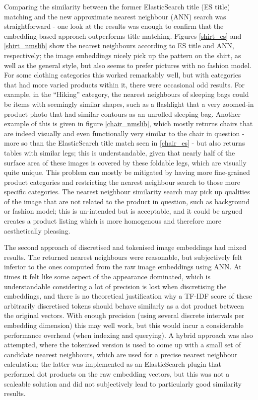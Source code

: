 Comparing the similarity between the former ElasticSearch title (ES title) matching and the new approximate nearest neighbour (ANN) search was straightforward - one look at the results was enough to confirm that the embedding-based approach outperforms title matching.
Figures \ref{shirt_es} and \ref{shirt_nmslib} show the nearest neighbours according to ES title and ANN, respectively; the image embeddings nicely pick up the pattern on the shirt, as well as the general style, but also seems to prefer pictures with no fashion model.
For some clothing categories this worked remarkably well, but with categories that had more varied products within it, there were occasional odd results.
For example, in the ``Hiking'' category, the nearest neighbours of sleeping bags could be items with seemingly similar shapes, such as a flashlight that a very zoomed-in product photo that had similar contours as an unrolled sleeping bag.
Another example of this is given in figure \ref{chair_nmslib}, which mostly returns chairs that are indeed visually and even functionally very similar to the chair in question - more so than the ElasticSearch title match seen in \ref{chair_es} - but also returns tables with similar legs; this is understandable, given that nearly half of the surface area of these images is covered by these foldable legs, which are visually quite unique.
This problem can mostly be mitigated by having more fine-grained product categories and restricting the nearest neighbour search to those more specific categories.
The nearest neighbour similarity search may pick up qualities of the image that are not related to the product in question, such as background or fashion model; this is un-intended but is acceptable, and it could be argued creates a product listing which is more homogenous and therefore more aesthetically pleasing.

The second approach of discretised and tokenised image embeddings had mixed results.
The returned nearest neighbours were reasonable, but subjectively felt inferior to the ones computed from the raw image embeddings using ANN.
At times it felt like some aspect of the appearance dominated, which is understandable considering a lot of precision is lost when discretising the embeddings, and there is no theoretical justification why a TF-IDF score of these arbitrarily discretised tokens should behave similarly as a dot product between the original vectors.
With enough precision (using several discrete intervals per embedding dimension) this may well work, but this would incur a considerable performance overhead (when indexing and querying).
A hybrid approach was also attempted, where the tokenised version is used to come up with a small set of candidate nearest neighbours, which are used for a precise nearest neighbour calculation; the latter was implemented as an ElasticSearch plugin that performed dot products on the raw embedding vectors, but this was not a scaleable solution and did not subjectively lead to particularly good similarity results.

